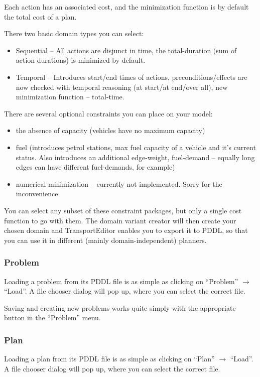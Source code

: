 Each action has an associated cost, and the minimization function is by default the total cost of a plan.

There two basic domain types you can select:

\begin{itemize}
\item Sequential -- All actions are disjunct in time, the total-duration (sum of action durations) is minimized by default.

\item Temporal -- Introduces start/end times of actions,
preconditions/effects are now checked with temporal reasoning (at start/at end/over all),
new minimization function -- total-time.
\end{itemize}

There are several optional constraints you can place on your model:

\begin{itemize}
\item the absence of capacity (vehicles have no maximum capacity)

\item fuel (introduces petrol stations, max fuel capacity of a vehicle and it's current status.
Also introduces an additional edge-weight, fuel-demand -- equally long edges can have different
fuel-demands, for example)

\item numerical minimization -- currently not implemented. Sorry for the inconvenience.
\end{itemize}

You can select any subset of these constraint packages, but only a single cost function to go with them.
The domain variant creator will then create your chosen domain and TransportEditor enables you to export it to PDDL,
so that you can use it in different (mainly domain-independent) planners.

\subsubsection*{Problem}
Loading a problem from its PDDL file is as simple as clicking on ``Problem'' $\to$ ``Load''.
A file chooser dialog will pop up, where you can select the correct file.

Saving and creating new problems works quite simply with the appropriate button in the ``Problem'' menu.

\subsubsection*{Plan}
Loading a plan from its PDDL file is as simple as clicking on ``Plan'' $\to$ ``Load''.
A file chooser dialog will pop up, where you can select the correct file.

